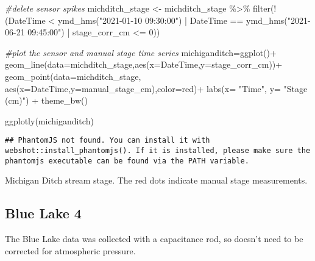 \documentclass[
]{book}
\newenvironment{Shaded}{\begin{snugshade}}{\end{snugshade}}
\newcommand{\AttributeTok}[1]{\textcolor[rgb]{0.77,0.63,0.00}{#1}}
\newcommand{\CommentTok}[1]{\textcolor[rgb]{0.56,0.35,0.01}{\textit{#1}}}
\newcommand{\DecValTok}[1]{\textcolor[rgb]{0.00,0.00,0.81}{#1}}
\newcommand{\FunctionTok}[1]{\textcolor[rgb]{0.00,0.00,0.00}{#1}}
\newcommand{\NormalTok}[1]{#1}
\newcommand{\OtherTok}[1]{\textcolor[rgb]{0.56,0.35,0.01}{#1}}
\newcommand{\SpecialCharTok}[1]{\textcolor[rgb]{0.00,0.00,0.00}{#1}}
\newcommand{\StringTok}[1]{\textcolor[rgb]{0.31,0.60,0.02}{#1}}
\begin{document}
\begin{Shaded}
\begin{Highlighting}[]
\CommentTok{\#delete sensor spikes}
\NormalTok{michditch\_stage }\OtherTok{\textless{}{-}}\NormalTok{ michditch\_stage }\SpecialCharTok{\%\textgreater{}\%}
  \FunctionTok{filter}\NormalTok{(}\SpecialCharTok{!}\NormalTok{(DateTime }\SpecialCharTok{\textless{}} \FunctionTok{ymd\_hms}\NormalTok{(}\StringTok{"2021{-}01{-}10 09:30:00"}\NormalTok{) }\SpecialCharTok{|}
\NormalTok{             DateTime }\SpecialCharTok{==} \FunctionTok{ymd\_hms}\NormalTok{(}\StringTok{"2021{-}06{-}21 09:45:00"}\NormalTok{) }\SpecialCharTok{|}
\NormalTok{             stage\_corr\_cm }\SpecialCharTok{\textless{}=} \DecValTok{0}\NormalTok{))}

\CommentTok{\#plot the sensor and manual stage time series}
\NormalTok{michiganditch}\OtherTok{=}\FunctionTok{ggplot}\NormalTok{()}\SpecialCharTok{+}
  \FunctionTok{geom\_line}\NormalTok{(}\AttributeTok{data=}\NormalTok{michditch\_stage,}\FunctionTok{aes}\NormalTok{(}\AttributeTok{x=}\NormalTok{DateTime,}\AttributeTok{y=}\NormalTok{stage\_corr\_cm))}\SpecialCharTok{+}
  \FunctionTok{geom\_point}\NormalTok{(}\AttributeTok{data=}\NormalTok{michditch\_stage, }\FunctionTok{aes}\NormalTok{(}\AttributeTok{x=}\NormalTok{DateTime,}\AttributeTok{y=}\NormalTok{manual\_stage\_cm),}\AttributeTok{color=}\StringTok{\textquotesingle{}red\textquotesingle{}}\NormalTok{)}\SpecialCharTok{+}
  \FunctionTok{labs}\NormalTok{(}\AttributeTok{x=} \StringTok{"Time"}\NormalTok{, }\AttributeTok{y=} \StringTok{"Stage (cm)"}\NormalTok{) }\SpecialCharTok{+}
  \FunctionTok{theme\_bw}\NormalTok{()}
  
\FunctionTok{ggplotly}\NormalTok{(michiganditch)}
\end{Highlighting}
\end{Shaded}

\begin{verbatim}
## PhantomJS not found. You can install it with webshot::install_phantomjs(). If it is installed, please make sure the phantomjs executable can be found via the PATH variable.
\end{verbatim}

\label{fig:michigan}Michigan Ditch stream stage. The red dots indicate manual stage measurements.

\hypertarget{blue-lake-4}{%
\subsection*{Blue Lake 4}\label{blue-lake-4}}

The Blue Lake data was collected with a capacitance rod, so doesn't need to be corrected for atmospheric pressure.
\end{document}
